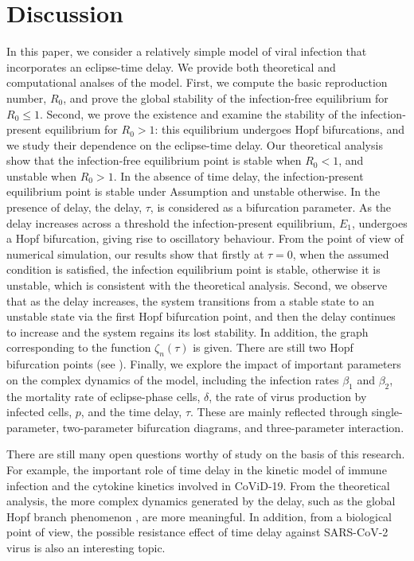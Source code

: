 \documentclass{CMHPhD-SIVD}
\begin{document}
\section{Discussion} \label{sec5}
In this paper, we consider a relatively simple model of viral infection that incorporates an eclipse-time delay.  We provide both theoretical and computational analses of the model. First, we compute the basic reproduction number, $R_0$, and prove the global stability of the infection-free equilibrium for $R_0\leq 1$. Second, we prove the existence and examine the stability of the infection-present equilibrium for $R_0>1$: this equilibrium undergoes Hopf bifurcations, and we study their dependence on the eclipse-time delay.
Our theoretical analysis show that the infection-free equilibrium point is stable when $R_0 < 1$, and unstable when $R_0 > 1$.
In the absence of time delay, the infection-present equilibrium point is stable under Assumption  and unstable otherwise.
In the presence of delay, the delay, $\tau$, is considered as a bifurcation parameter.  As the delay increases across a threshold the infection-present equilibrium, $E_1$, undergoes a Hopf bifurcation, giving rise to oscillatory behaviour.
From the point of view of numerical simulation, our results show that firstly at $\tau=0$, when the assumed condition is satisfied, the infection equilibrium point is stable, otherwise it is unstable, which is consistent with the theoretical analysis.
Second, we observe that as the delay increases, the system transitions from a stable state to an unstable state via the first Hopf bifurcation point, and then the delay continues to increase and the system regains its lost stability. In addition, the graph corresponding to the function $\zeta_n(\tau)$ is given. There are still two Hopf bifurcation points (see ). Finally, we explore the impact of important parameters on the complex dynamics of the model,  including the infection rates $\beta_1$ and $\beta_2$, the mortality rate of eclipse-phase cells, $\delta$, the rate of virus production by infected cells, $p$, and the time delay, $\tau$. These are mainly reflected through single-parameter, two-parameter bifurcation diagrams, and three-parameter interaction.

There are still many open questions worthy of study on the basis of this research. For example, the important role of time delay in the kinetic model of immune infection and the cytokine kinetics involved in CoViD-19. From the theoretical analysis, the more complex dynamics generated by the delay, such as the global Hopf branch phenomenon \cite{shu2020complex,jiang2016global}, are more meaningful. In addition, from a biological point of view, the possible resistance effect of time delay against SARS-CoV-2 virus is also an interesting topic.
\end{document}

